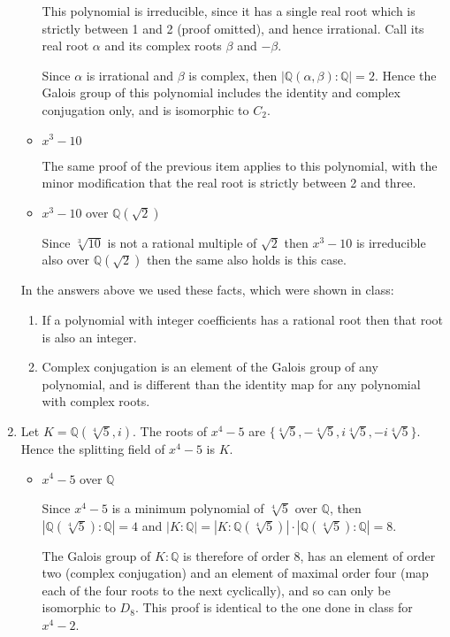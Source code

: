 \documentclass[11pt]{article} \usepackage{amssymb}
\newcommand{\Q}{\mathbb Q}
\begin{document}
\begin{enumerate}
\begin{itemize}
      This polynomial is irreducible, since it has a single real root which
      is strictly between 1 and 2 (proof omitted), and hence irrational. 
      Call its real root
      $\alpha$ and its complex roots $\beta$ and $-\beta$. 

      Since $\alpha$ is irrational and $\beta$ is complex, then 
      $|\Q(\alpha,\beta):\Q|=2$. Hence the Galois group of this polynomial
      includes the identity and complex conjugation only, and is isomorphic
      to $C_2$.
      
    \item $x^3-10$
      
      The same proof of the previous item applies to this polynomial, with the
      minor modification that the real root is strictly between 2 and three.

    \item $x^3-10$ over $\Q(\sqrt{2})$

      Since $\sqrt[3]{10}$ is not a rational multiple of $\sqrt{2}$ then
      $x^3-10$ is irreducible also over $\Q(\sqrt{2})$ then the same
      also holds is this case.

    \end{itemize}
    In the answers above we used these facts, which were shown in class:
    \begin{enumerate}
    \item If a 
      polynomial with integer coefficients has a rational root then that root
      is also an integer.
    \item Complex conjugation is an element of the Galois group of any 
      polynomial, and is different than the identity map for any polynomial
      with complex roots.
    \end{enumerate}
    
      
  \item
    Let $K=\Q(\sqrt[4]{5}, i)$.
    The roots of $x^4-5$ are 
    $\{\sqrt[4]{5},-\sqrt[4]{5}, i\sqrt[4]{5},-i\sqrt[4]{5}\}$.
    Hence the splitting field of $x^4-5$ is $K$.

    \begin{itemize}
    \item $x^4-5$ over $\Q$

      Since $x^4-5$ is a minimum polynomial of $\sqrt[4]{5}$ over $\Q$, then 
      $|\Q(\sqrt[4]{5}):\Q|=4$ and 
      $|K:\Q|=|K:\Q(\sqrt[4]{5})|\cdot|\Q(\sqrt[4]{5}):\Q|=8$.

      The Galois group of $K:\Q$ is therefore of order 8, has an element of
      order two (complex conjugation) and an element of maximal order four (map
      each of the four roots to the next cyclically), and so can only be 
      isomorphic to $D_8$. This proof is identical to the one done in class
      for $x^4-2$.
      

\end{itemize}
\end{enumerate}
\end{document}
